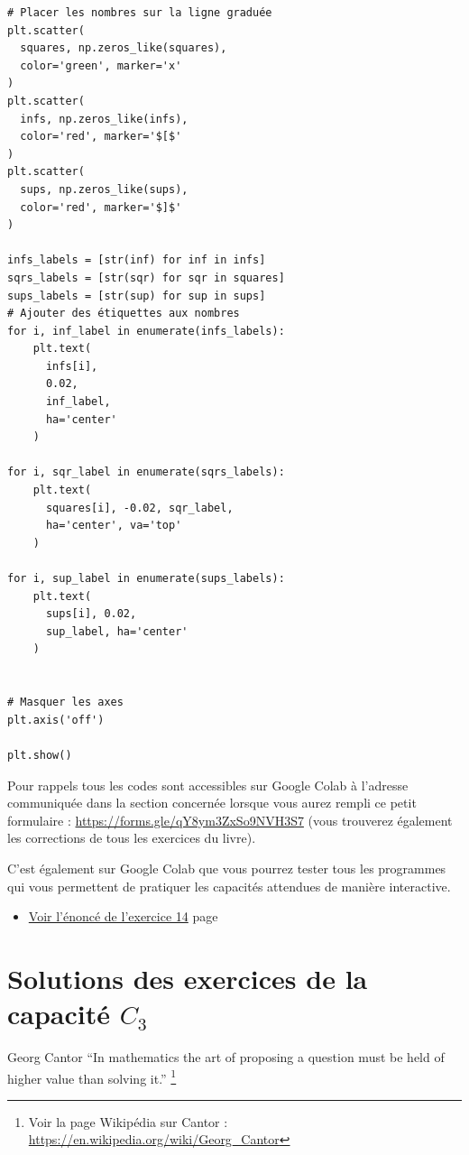 \documentclass[a4paper,11pt]{book}
\begin{document}
\begin{verbatim}
# Placer les nombres sur la ligne graduée
plt.scatter(
  squares, np.zeros_like(squares),
  color='green', marker='x'
)
plt.scatter(
  infs, np.zeros_like(infs),
  color='red', marker='$[$'
)
plt.scatter(
  sups, np.zeros_like(sups),
  color='red', marker='$]$'
)

infs_labels = [str(inf) for inf in infs]
sqrs_labels = [str(sqr) for sqr in squares]
sups_labels = [str(sup) for sup in sups]
# Ajouter des étiquettes aux nombres
for i, inf_label in enumerate(infs_labels):
    plt.text(
      infs[i],
      0.02,
      inf_label,
      ha='center'
    )

for i, sqr_label in enumerate(sqrs_labels):
    plt.text(
      squares[i], -0.02, sqr_label,
      ha='center', va='top'
    )

for i, sup_label in enumerate(sups_labels):
    plt.text(
      sups[i], 0.02,
      sup_label, ha='center'
    )


# Masquer les axes
plt.axis('off')

plt.show()
\end{verbatim}

\clearpage

Pour rappels tous les codes sont accessibles sur Google Colab à
l'adresse communiquée dans la section concernée lorsque vous
aurez rempli ce petit formulaire : \url{https://forms.gle/qY8ym3ZxSo9NVH3S7}
(vous trouverez également les corrections de tous les exercices du
livre).

C'est également sur Google Colab que vous pourrez tester tous les
programmes qui vous permettent de pratiquer les capacités attendues
de manière interactive.


\begin{itemize}
\item \hyperref[org7d5ffab]{Voir l'énoncé de l'exercice 14}
page~\pageref{page:sec3.3.2exo14}
\end{itemize}

\clearpage
\chapter{Solutions des exercices de la capacité \(C_3\)}
\label{sec:org5469a12}
\label{org0574bca}
\label{page:sec9.3sols-capacity3}

\begin{myquote}{Georg Cantor}
\enquote{In mathematics the art of proposing a question must be held of
higher value than solving it.}
\footnote{Voir la page Wikipédia sur Cantor : \url{https://en.wikipedia.org/wiki/Georg_Cantor}}
\end{myquote}
\end{document}

